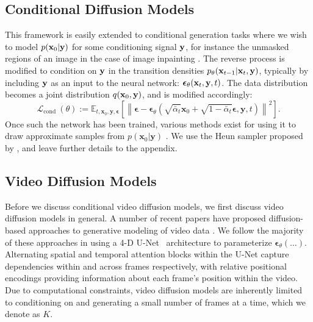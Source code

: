 \subsection{Conditional Diffusion Models}
This framework is easily extended to conditional generation tasks where we wish to model $p(\mathbf{x}_0|\mathbf{y})$ for some conditioning signal $\mathbf{y}$, for instance the unmasked regions of an image in the case of image inpainting \citep{palette}. The reverse process is modified to condition on $\mathbf{y}$ in the transition densities $p_\theta(\mathbf{x}_{t-1}|\mathbf{x}_t, \mathbf{y})$, typically by including $\mathbf{y}$ as an input to the neural network: $\boldsymbol{\epsilon}_\theta(\mathbf{x}_t, \mathbf{y}, t)$. The data distribution becomes a joint distribution $q(\mathbf{x}_0, \mathbf{y})$, and  is modified accordingly:		
\begin{equation}
    \mathcal{L}_{\text {cond }}(\theta):=\mathbb{E}_{t, \mathbf{x}_0, \mathbf{y}, \boldsymbol{\epsilon}}\left[\left\|\boldsymbol{\epsilon}-\boldsymbol{\epsilon}_\theta\left(\sqrt{\bar{\alpha}_t} \mathbf{x}_0+\sqrt{1-\bar{\alpha}_t} \boldsymbol{\epsilon}, \mathbf{y}, t\right)\right\|^2\right].
    \label{eq:lcond}
\end{equation}
Once such the network has been trained, various methods exist for using it to draw approximate samples from $p(\mathbf{x}_0|\mathbf{y})$ \citep{ddpm,sohldickstein,tashiro2021csdi,song2020score,karras2022elucidating}. We use the Heun sampler proposed by \citet{karras2022elucidating}, and leave further details to the appendix.




\subsection{Video Diffusion Models}
Before we discuss conditional video diffusion models, we first discuss video diffusion models in general. A number of recent papers have proposed diffusion-based approaches to generative modeling of video data \citep{didrik, fdm, vdm, yang2022diffusion, voleti2022MCVD}. 
We follow the majority of these approaches \citep{fdm,vdm,voleti2022MCVD} in using a 4-D U-Net~\citep{unet} architecture to parameterize $\boldsymbol{\epsilon}_\theta(\ldots)$. 
Alternating spatial and temporal attention blocks within the U-Net capture dependencies within and across frames respectively, with relative positional encodings \citep{rpe1, rpe2} providing information about each frame's position within the video. 
Due to computational constraints, video diffusion models are inherently limited to conditioning on and generating a small number of frames at a time, which we denote as $K$. 


